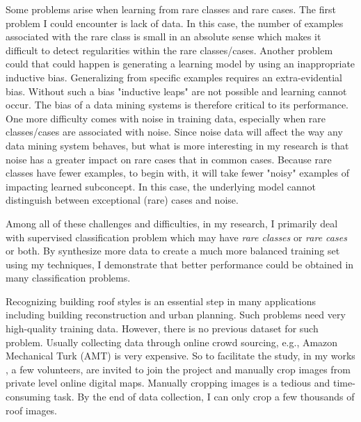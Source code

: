 \documentclass{iitthesis}
\begin{document}
Some problems arise when learning from rare classes and rare cases. The first problem I could encounter is lack of data. In this case, the number of examples associated with the rare class is small in an absolute sense which makes it difficult to detect regularities within the rare classes/cases. Another problem could that could happen is generating a learning model by using an inappropriate inductive bias. Generalizing from specific examples requires an extra-evidential bias. Without such a bias "inductive leaps" are not possible and learning cannot occur. The bias of a data mining systems is therefore critical to its performance. One more difficulty comes with noise in training data, especially when rare classes/cases are associated with noise. Since noise data will affect the way any data mining system behaves, but what is more interesting in my research is that noise has a greater impact on rare cases that in common cases. Because rare classes have fewer examples, to begin with, it will take fewer "noisy" examples of impacting learned subconcept. In this case, the underlying model cannot distinguish between exceptional (rare) cases and noise.

Among all of these challenges and difficulties, in my research, I primarily deal with supervised classification problem which may have \textit{rare classes} or \textit{rare cases} or both. By synthesize more data to create a much more balanced training set using my techniques, I demonstrate that better performance could be obtained in many classification problems.

 Recognizing building roof styles is an essential step in many applications including building reconstruction and urban planning. Such problems need very high-quality training data. However, there is no previous dataset for such problem. Usually collecting data through online crowd sourcing, e.g., Amazon Mechanical Turk (AMT) is very expensive. So to facilitate the study, in my works \cite{AndiZang2015}\cite{Zhang2014Autoencoder}, a few volunteers, are invited to join the project and manually crop images from private level online digital maps. Manually cropping images is a tedious and time-consuming task. By the end of data collection, I can only crop a few thousands of roof images. 
\end{document}
